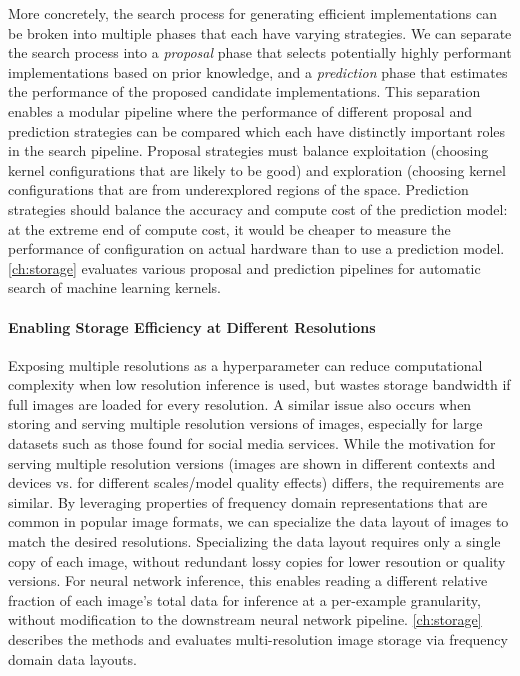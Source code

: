 More concretely, the search process for generating efficient implementations can be broken into multiple phases that each have varying strategies.
We can separate the search process into a \emph{proposal} phase that selects potentially highly performant implementations based on prior knowledge, and a \emph{prediction} phase that estimates the performance of the proposed candidate implementations.
This separation enables a modular pipeline where the performance of different proposal and prediction strategies can be compared which each have distinctly important roles in the search pipeline.
Proposal strategies must balance exploitation (choosing kernel configurations that are likely to be good) and exploration (choosing kernel configurations that are from underexplored regions of the space.
Prediction strategies should balance the accuracy and compute cost of the prediction model: at the extreme end of compute cost, it would be cheaper to measure the performance of configuration on actual hardware than to use a prediction model.
\autoref{ch:storage} evaluates various proposal and prediction pipelines for automatic search of machine learning kernels.


\paragraph{Enabling Storage Efficiency at Different Resolutions}
Exposing multiple resolutions as a hyperparameter can reduce computational complexity when low resolution inference is used, but wastes storage bandwidth if full images are loaded for every resolution.
A similar issue also occurs when storing and serving multiple resolution versions of images, especially for large datasets such as those found for social media services.
While the motivation for serving multiple resolution versions (images are shown in different contexts and devices vs. for different scales/model quality effects) differs, the requirements are similar.
By leveraging properties of frequency domain representations that are common in popular image formats, we can specialize the data layout of images to match the desired resolutions.
Specializing the data layout requires only a single copy of each image, without redundant lossy copies for lower resoution or quality versions.
For neural network inference, this enables reading a different relative fraction of each image's total data for inference at a per-example granularity, without modification to the downstream neural network pipeline.
\autoref{ch:storage} describes the methods and evaluates multi-resolution image storage via frequency domain data layouts.


